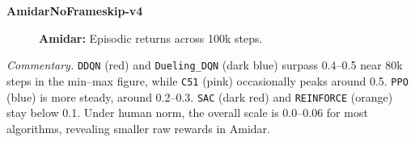 \bigskip

\noindent
\textbf{AmidarNoFrameskip-v4}
\begin{figure}[htbp]
	\centering
	\quad
	\caption{\textbf{Amidar:} Episodic returns across 100k steps.}
	\label{fig:amidar_comparison_combined}
\end{figure}

\noindent
\emph{Commentary.} 
\texttt{DDQN} (red) and \texttt{Dueling\_DQN} (dark blue) surpass 0.4--0.5 near 80k steps 
in the min--max figure, while \texttt{C51} (pink) occasionally peaks around 0.5. 
\texttt{PPO} (blue) is more steady, around 0.2--0.3. \texttt{SAC} (dark red) 
and \texttt{REINFORCE} (orange) stay below 0.1. 
Under human norm, the overall scale is 0.0--0.06 for most algorithms, 
revealing smaller raw rewards in Amidar.

\bigskip

